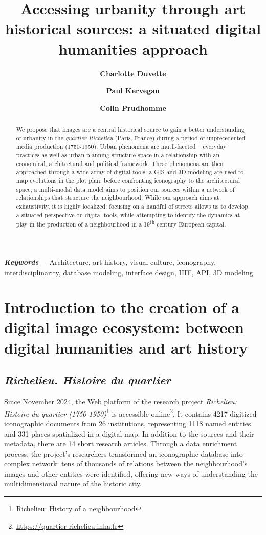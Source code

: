 \documentclass[12pt, a4paper, twocolumn]{article}
\title{Accessing urbanity through art historical sources: a situated digital humanities approach}
\author[1]{\textbf{Charlotte Duvette}}
\author[2]{\textbf{Paul Kervegan}}
\author[3]{\textbf{Colin Prudhomme}}
\affil[1]{
    École nationale supérieure d'architecture de Bretagne}
\affil[2]{
    LIGM, École des Ponts, IP Paris, UGE, CNRS}
\affil[3]{
    École nationale des chartes et École Centrale de Lille}
\providecommand{\keywords}[1]{
  \noindent\small	
  \textbf{\textit{Keywords---}} #1
}
\begin{document}
\maketitle

\begin{abstract}
We propose that images are a central historical source to gain a better understanding of urbanity in the \textit{quartier Richelieu} (Paris, France) during a period of unprecedented media production (1750-1950). Urban phenomena are mutli-faceted -- everyday practices as well as urban planning structure space in a relationship with an economical, architectural and political framework. These phenomena are then approached through a wide array of digital tools: a GIS and 3D modeling are used to map evolutions in the plot plan, before confronting iconography to the architectural space; a multi-modal data model aims to position our sources within a network of relationships that structure the neighbourhood. While our approach aims at exhaustivity, it is highly localized: focusing on a handful of streets allows us to develop a situated perspective on digital tools, while attempting to identify the dynamics at play in the production of a neighbourhood in a 19\textsuperscript{th} century European capital.
\end{abstract}

\keywords{Architecture, art history, visual culture, iconography, interdisciplinarity, database modeling, interface design, IIIF, API, 3D modeling
}

\section{Introduction to the creation of a digital image ecosystem: between digital humanities and art history}
\subsection{\textit{Richelieu. Histoire du quartier}}

Since November 2024, the Web platform of the research project \textit{Richelieu: Histoire du quartier (1750-1950)}\footnote{Richelieu: History of a neighbourhood}  is  accessible online\footnote{\url{https://quartier-richelieu.inha.fr}}. It contains 4217 digitized iconographic documents from 26 institutions, representing 1118 named entities and 331 places spatialized in a digital map. In addition to the sources and their metadata, there are 14 short research articles. Through a data enrichment process, the project's researchers transformed an iconographic database into complex network: tens of thousands of relations between the neighbourhood's images and other entities were identified,  offering new ways  of understanding the multidimensional nature of the historic city. 
\end{document}
